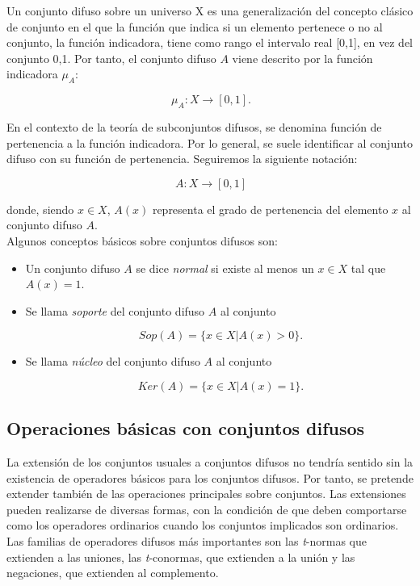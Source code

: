 Un conjunto difuso sobre un universo X es una generalización del concepto clásico de conjunto en el que la función que indica si un elemento pertenece o no al conjunto, la función indicadora, tiene como rango el intervalo real [0,1], en vez del conjunto {0,1}. Por tanto, el conjunto difuso $A$ viene descrito por la función indicadora $\mu_A$:

\[
\ \mu_A : X \longrightarrow [0,1].
\]

En el contexto de la teoría de subconjuntos difusos, se denomina función de pertenencia a la función indicadora. Por lo general, se suele identificar al conjunto difuso con su función de pertenencia. Seguiremos la siguiente notación:

\[
\ A : X \longrightarrow [0,1]
\]

donde, siendo $x \in X$, $A(x)$ representa el grado de pertenencia del elemento $x$ al conjunto difuso $A$.\\

Algunos conceptos básicos sobre conjuntos difusos son:

\begin{itemize}
\item Un conjunto difuso $A$ se dice \textit{normal} si existe al menos un $x \in X$ tal que $A(x)=1$.
\item Se llama \textit{soporte} del conjunto difuso $A$ al conjunto

\[
\ Sop(A) = \lbrace x \in X | A(x) > 0 \rbrace.
\] 
\item Se llama \textit{núcleo} del conjunto difuso $A$ al conjunto

\[
\ Ker(A) = \lbrace x \in X | A(x) = 1 \rbrace.
\] 
\end{itemize}

\subsection{Operaciones básicas con conjuntos difusos}

La extensión de los conjuntos usuales a conjuntos difusos no tendría sentido sin la existencia de operadores básicos para los conjuntos difusos. Por tanto, se pretende extender también de las operaciones principales sobre conjuntos. Las extensiones pueden realizarse de diversas formas, con la condición de que deben comportarse como los operadores ordinarios cuando los conjuntos implicados son ordinarios. Las familias de operadores difusos más importantes son las \textit{t}-normas que extienden a las uniones, las \textit{t}-conormas, que extienden a la unión y las negaciones, que extienden al complemento.\\

